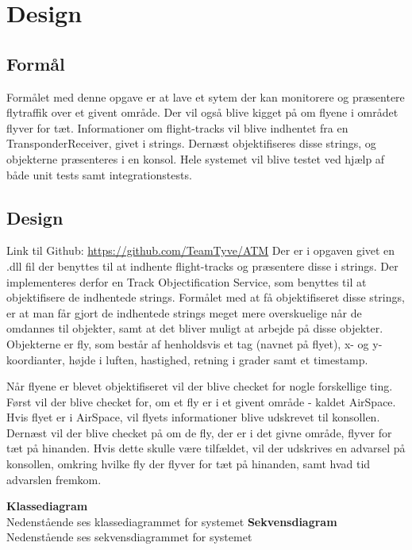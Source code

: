 \chapter{Design}
\section{Formål}
Formålet med denne opgave er at lave et sytem der kan monitorere og præsentere flytraffik over et givent område. Der vil også blive kigget på om flyene i området flyver for tæt. Informationer om flight-tracks vil blive indhentet fra en TransponderReceiver, givet i strings. Dernæst objektifiseres disse strings, og objekterne præsenteres i en konsol. 
Hele systemet vil blive testet ved hjælp af både unit tests samt integrationstests.


\section{Design}
Link til Github: \url{https://github.com/TeamTyve/ATM} \newline \newline 
Der er i opgaven givet en .dll fil der benyttes til at indhente flight-tracks og præsentere disse i strings. Der implementeres derfor en Track Objectification Service, som benyttes til at objektifisere de indhentede strings. \tabularnewline
Formålet med at få objektifiseret disse strings, er at man får gjort de indhentede strings meget mere overskuelige når de omdannes til objekter, samt at det bliver muligt at arbejde på disse objekter. \newline
Objekterne er fly, som består af henholdsvis et tag (navnet på flyet), x- og y-koordianter, højde i luften, hastighed, retning i grader samt et timestamp. \newline \newline

Når flyene er blevet objektifiseret vil der blive checket for nogle forskellige ting. \tabularnewline
Først vil der blive checket for, om et fly er i et givent område - kaldet AirSpace. Hvis flyet er i AirSpace, vil flyets informationer blive udskrevet til konsollen.
Dernæst vil der blive checket på om de fly, der er i det givne område, flyver for tæt på hinanden. Hvis dette skulle være tilfældet, vil der udskrives en advarsel på konsollen, omkring hvilke fly der flyver for tæt på hinanden, samt hvad tid advarslen fremkom.




\textbf{Klassediagram} \\
Nedenstående ses klassediagrammet for systemet \newline
\textbf{Sekvensdiagram} \\
Nedenstående ses sekvensdiagrammet for systemet \newline



